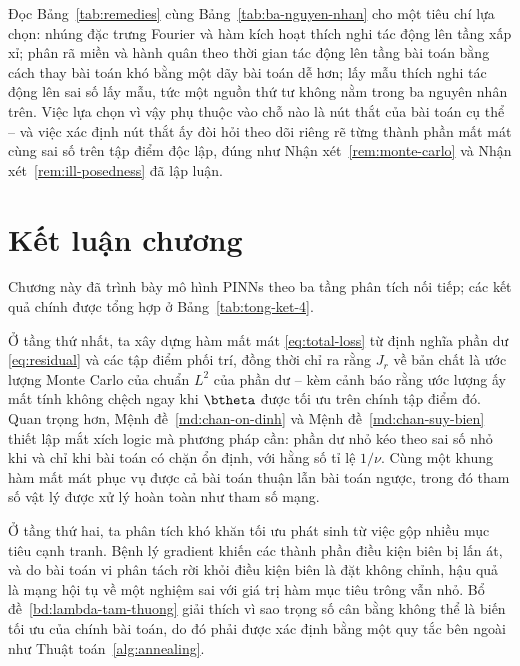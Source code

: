 Đọc Bảng~\ref{tab:remedies} cùng Bảng~\ref{tab:ba-nguyen-nhan} cho một tiêu chí
lựa chọn: nhúng đặc trưng Fourier và hàm kích hoạt thích nghi tác động lên tầng
xấp xỉ; phân rã miền và hành quân theo thời gian tác động lên tầng bài toán bằng
cách thay bài toán khó bằng một dãy bài toán dễ hơn; lấy mẫu thích nghi tác động
lên sai số lấy mẫu, tức một nguồn thứ tư không nằm trong ba nguyên nhân trên. Việc
lựa chọn vì vậy phụ thuộc vào chỗ nào là nút thắt của bài toán cụ thể -- và việc
xác định nút thắt ấy đòi hỏi theo dõi riêng rẽ từng thành phần mất mát cùng sai số
trên tập điểm độc lập, đúng như Nhận xét~\ref{rem:monte-carlo} và
Nhận xét~\ref{rem:ill-posedness} đã lập luận.
 
\section*{Kết luận chương}
 
Chương này đã trình bày mô hình PINNs theo ba tầng phân tích nối tiếp; các kết
quả chính được tổng hợp ở Bảng~\ref{tab:tong-ket-4}.
 
Ở tầng thứ nhất, ta xây dựng hàm mất mát \eqref{eq:total-loss} từ định nghĩa phần
dư \eqref{eq:residual} và các tập điểm phối trí, đồng thời chỉ ra rằng $J_{r}$ về
bản chất là ước lượng Monte Carlo của chuẩn $L^{2}$ của phần dư -- kèm cảnh báo
rằng ước lượng ấy mất tính không chệch ngay khi $\btheta$ được tối ưu trên chính
tập điểm đó. Quan trọng hơn, Mệnh đề~\ref{md:chan-on-dinh} và
Mệnh đề~\ref{md:chan-suy-bien} thiết lập mắt xích logic mà phương pháp cần: phần
dư nhỏ kéo theo sai số nhỏ khi và chỉ khi bài toán có chặn ổn định, với hằng số
tỉ lệ $1/\nu$. Cùng một khung hàm mất mát phục vụ được cả bài toán thuận lẫn bài
toán ngược, trong đó tham số vật lý được xử lý hoàn toàn như tham số mạng.
 
Ở tầng thứ hai, ta phân tích khó khăn tối ưu phát sinh từ việc gộp nhiều mục tiêu
cạnh tranh. Bệnh lý gradient khiến các thành phần điều kiện biên bị lấn át, và do
bài toán vi phân tách rời khỏi điều kiện biên là đặt không chỉnh, hậu quả là mạng
hội tụ về một nghiệm sai với giá trị hàm mục tiêu trông vẫn nhỏ.
Bổ đề~\ref{bd:lambda-tam-thuong} giải thích vì sao trọng số cân bằng không thể là
biến tối ưu của chính bài toán, do đó phải được xác định bằng một quy tắc bên
ngoài như Thuật toán~\ref{alg:annealing}.
 
